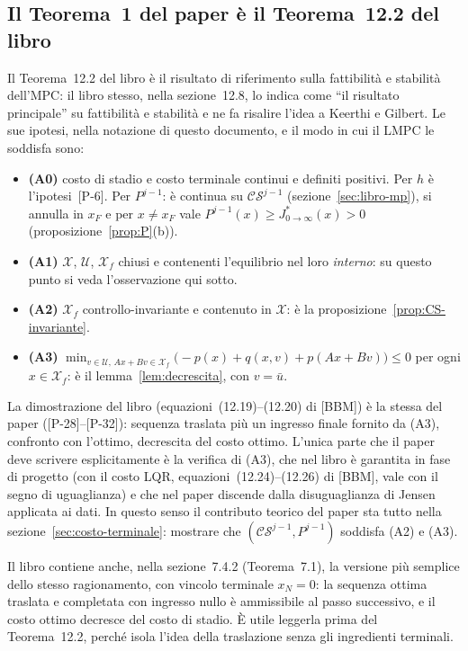 \documentclass[11pt,a4paper]{article}
\theoremstyle{definition}
\theoremstyle{plain}
\theoremstyle{remark}
\newcommand{\Xc}{\mathcal{X}}
\newcommand{\Uc}{\mathcal{U}}
\newcommand{\Xf}{\mathcal{X}_f}
\newcommand{\CS}{\mathcal{CS}}
\newcommand{\Jstar}{J^{*}_{0\to\infty}}
\newcommand{\eqp}[1]{\textup{[P-#1]}}   %
\begin{document}
\subsection{Il Teorema~1 del paper è il Teorema~12.2 del libro}\label{sec:libro-teorema}

Il Teorema~12.2 del libro è il risultato di riferimento sulla fattibilità e
stabilità dell'MPC: il libro stesso, nella sezione~12.8, lo indica come ``il
risultato principale'' su fattibilità e stabilità e ne fa risalire l'idea a
Keerthi e Gilbert. Le sue ipotesi, nella notazione di questo documento, e il modo in
cui il LMPC le soddisfa sono:
\begin{itemize}
  \item \textbf{(A0)} costo di stadio e costo terminale continui e definiti
        positivi. Per $h$ è l'ipotesi~\eqp{6}. Per $P^{j-1}$: è continua su
        $\CS^{j-1}$ (sezione~\ref{sec:libro-mp}), si annulla in $x_F$ e per
        $x\ne x_F$ vale $P^{j-1}(x)\ge\Jstar(x)>0$
        (proposizione~\ref{prop:P}(b)).
  \item \textbf{(A1)} $\Xc$, $\Uc$, $\Xf$ chiusi e contenenti l'equilibrio
        nel loro \emph{interno}: su questo punto si veda l'osservazione
        qui sotto.
  \item \textbf{(A2)} $\Xf$ controllo-invariante e contenuto in $\Xc$: è la
        proposizione~\ref{prop:CS-invariante}.
  \item \textbf{(A3)}
        $\displaystyle\min_{v\in\Uc,\,Ax+Bv\in\Xf}\big(-p(x)+q(x,v)+p(Ax+Bv)\big)\le 0$
        per ogni $x\in\Xf$: è il lemma~\ref{lem:decrescita}, con
        $v=\bar u$.
\end{itemize}
La dimostrazione del libro (equazioni~(12.19)--(12.20) di [BBM]) è la stessa
del paper (\eqp{28}--\eqp{32}): sequenza traslata più un ingresso finale
fornito da (A3), confronto con l'ottimo, decrescita del costo ottimo. L'unica
parte che il paper deve scrivere esplicitamente è la verifica di (A3), che nel
libro è garantita in fase di progetto (con il costo LQR, equazioni~(12.24)--(12.26)
di [BBM], vale con il segno di uguaglianza) e che nel paper discende dalla
disuguaglianza di Jensen applicata ai dati. In questo senso il contributo
teorico del paper sta tutto nella sezione~\ref{sec:costo-terminale}: mostrare
che $(\CS^{j-1},P^{j-1})$ soddisfa (A2) e (A3).

Il libro contiene anche, nella sezione~7.4.2 (Teorema~7.1), la versione più
semplice dello stesso ragionamento, con vincolo terminale $x_N=0$: la sequenza
ottima traslata e completata con ingresso nullo è ammissibile al passo
successivo, e il costo ottimo decresce del costo di stadio. È utile
leggerla prima del Teorema~12.2, perché isola l'idea della traslazione senza
gli ingredienti terminali.
\end{document}
